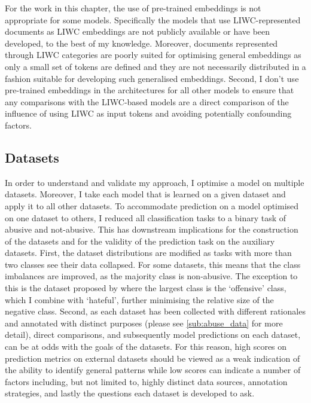 For the work in this chapter, the use of pre-trained embeddings is not appropriate for some models.
Specifically the models that use LIWC-represented documents as LIWC embeddings are not publicly available or have been developed, to the best of my knowledge.
Moreover, documents represented through LIWC categories are poorly suited for optimising general embeddings as only a small set of tokens are defined and they are not necessarily distributed in a fashion suitable for developing such generalised  embeddings.
Second, I don't use pre-trained embeddings in the architectures for all other models to ensure that any comparisons with the LIWC-based models are a direct comparison of the influence of using LIWC as input tokens and avoiding potentially confounding factors.

\subsection{Datasets}\label{sub:liwc_datasets}
In order to understand and validate my approach, I optimise a model on multiple datasets.
Moreover, I take each model that is learned on a given dataset and apply it to all other datasets.
To accommodate prediction on a model optimised on one dataset to others, I reduced all classification tasks to a binary task of abusive and not-abusive.
This has downstream implications for the construction of the datasets and for the validity of the prediction task on the auxiliary datasets.
First, the dataset distributions are modified as tasks with more than two classes see their data collapsed. 
For some datasets, this means that the class imbalances are improved, as the majority class is non-abusive.
The exception to this is the dataset proposed by \citet{Davidson:2017} where the largest class is the `offensive' class, which I combine with `hateful', further minimising the relative size of the negative class.
Second, as each dataset has been collected with different rationales and annotated with distinct purposes (please see \cref{sub:abuse_data} for more detail), direct comparisons, and subsequently model predictions on each dataset, can be at odds with the goals of the datasets.
For this reason, high scores on prediction metrics on external datasets should be viewed as a weak indication of the ability to identify general patterns while low scores can indicate a number of factors including, but not limited to, highly distinct data sources, annotation strategies, and lastly the questions each dataset is developed to ask.

